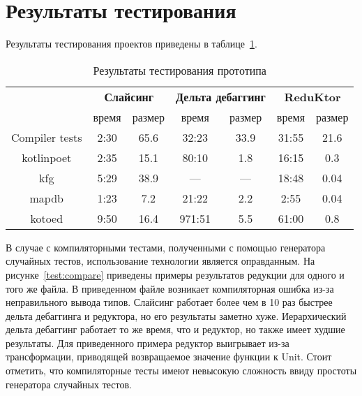 \section{Результаты тестирования}
Результаты тестирования проектов приведены в таблице~\ref{tab:testing}.
\begin{table}[]
\center
\caption{\label{tab:testing}Результаты тестирования прототипа}
\begin{tabular}{| c | c | c | c | c | c | c |}
\hline
\bf \multirow{2}{*}{Проект} & \multicolumn{2}{|c|}{\bf Слайсинг} & \multicolumn{2}{|c|}{\bf Дельта дебаггинг}  & \multicolumn{2}{|c|}{\bf ReduKtor} \\
\cline{2-7}
& время & размер & время & размер & время & размер \\
\hline
Compiler tests & 2:30 & 65.6 & 32:23 & 33.9 & 31:55 & 21.6 \\
\hline
kotlinpoet & 2:35 & 15.1 & 80:10 & 1.8 & 16:15 & 0.3 \\
\hline
kfg & 5:29 & 38.9 & --- & --- & 18:48 & 0.04 \\
\hline
mapdb & 1:23 & 7.2 & 21:22 & 2.2 & 2:55 & 0.04 \\
\hline
kotoed & 9:50 & 16.4 & 971:51 & 5.5 & 61:00 & 0.8 \\
\hline
\end{tabular}
\end{table}
В случае с компиляторными тестами, полученными с помощью генератора случайных тестов, использование технологии является оправданным. На рисунке~\ref{test:compare} приведены примеры результатов редукции для одного и того же файла. В приведенном файле возникает компиляторная ошибка из-за неправильного вывода типов. Слайсинг работает более чем в 10 раз быстрее дельта дебаггинга и редуктора, но его результаты заметно хуже. Иерархический дельта дебаггинг работает то же время, что и редуктор, но также имеет худшие результаты. Для приведенного примера редуктор выигрывает из-за трансформации, приводящей возвращаемое значение функции к Unit. Стоит отметить, что компиляторные тесты имеют невысокую сложность ввиду простоты генератора случайных тестов.
